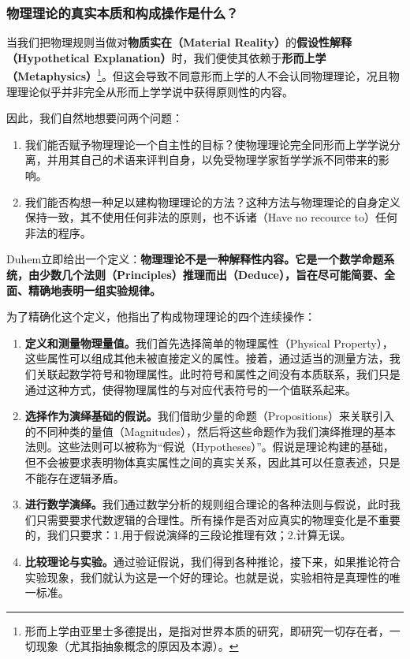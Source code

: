 \documentclass[12pt, a4paper, oneside]{ctexart}
\renewcommand{\b}{\textbf}
\newcommand{\f}{\footnote}
\begin{document}
\subsubsection{物理理论的真实本质和构成操作是什么？}

当我们把物理规则当做对\b{物质实在（Material Reality）}的\b{假设性解释（Hypothetical Explanation）}时，我们便使其依赖于\b{形而上学（Metaphysics）}\f{形而上学由亚里士多德提出，是指对世界本质的研究，即研究一切存在者，一切现象（尤其指抽象概念的原因及本源）。}。但这会导致不同意形而上学的人不会认同物理理论，况且物理理论似乎并非完全从形而上学学说中获得原则性的内容。

因此，我们自然地想要问两个问题：
\begin{enumerate}
    \item 我们能否赋予物理理论一个自主性的目标？使物理理论完全同形而上学学说分离，并用其自己的术语来评判自身，以免受物理学家哲学学派不同带来的影响。
    \item 我们能否构想一种足以建构物理理论的方法？这种方法与物理理论的自身定义保持一致，其不使用任何非法的原则，也不诉诸（Have no recource to）任何非法的程序。
\end{enumerate}

Duhem立即给出一个定义：\b{物理理论不是一种解释性内容。它是一个数学命题系统，由少数几个法则（Principles）推理而出（Deduce），旨在尽可能简要、全面、精确地表明一组实验规律。}

为了精确化这个定义，他指出了构成物理理论的四个连续操作：
\begin{enumerate}
    \item \b{定义和测量物理量值。}我们首先选择简单的物理属性（Physical Property），这些属性可以组成其他未被直接定义的属性。接着，通过适当的测量方法，我们关联起数学符号和物理属性。此时符号和属性之间没有本质联系，我们只是通过这种方式，使得物理属性的与对应代表符号的一个值联系起来。
    \item \b{选择作为演绎基础的假说。}我们借助少量的命题（Propositions）来关联引入的不同种类的量值（Magnitudes），然后将这些命题作为我们演绎推理的基本法则。这些法则可以被称为“假说（Hypotheses）”。假说是理论构建的基础，但不会被要求表明物体真实属性之间的真实关系，因此其可以任意表述，只是不能存在逻辑矛盾。
    \item \b{进行数学演绎。}我们通过数学分析的规则组合理论的各种法则与假说，此时我们只需要要求代数逻辑的合理性。所有操作是否对应真实的物理变化是不重要的，我们只要求：1.用于假说演绎的三段论推理有效；2.计算无误。
    \item \b{比较理论与实验。}通过验证假说，我们得到各种推论，接下来，如果推论符合实验现象，我们就认为这是一个好的理论。也就是说，实验相符是真理性的唯一标准。
\end{enumerate}
\end{document}
